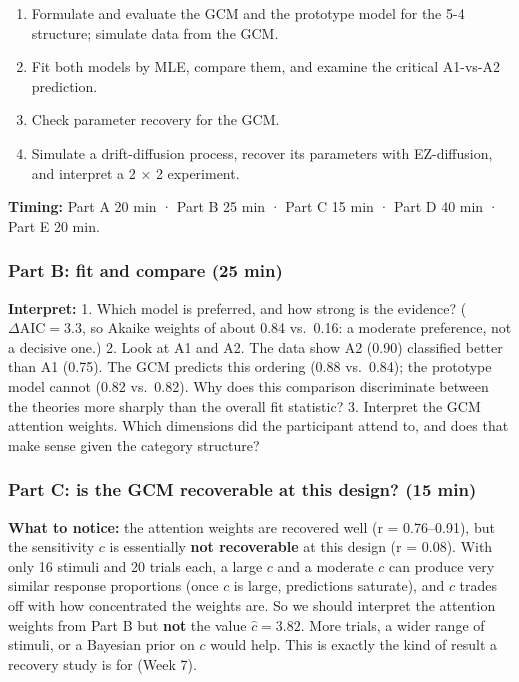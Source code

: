 \begin{enumerate}
\def\labelenumi{\arabic{enumi}.}
\tightlist
\item
  Formulate and evaluate the GCM and the prototype model for the 5-4 structure;
  simulate data from the GCM.
\item
  Fit both models by MLE, compare them, and examine the critical
  A1-vs-A2 prediction.
\item
  Check parameter recovery for the GCM.
\item
  Simulate a drift-diffusion process, recover its parameters with
  EZ-diffusion, and interpret a 2 × 2 experiment.
\end{enumerate}

\textbf{Timing:} Part A 20 min · Part B 25 min · Part C 15 min · Part D
40 min · Part E 20 min.

\subsubsection{Part B: fit and compare (25 min)}

\textbf{Interpret:} 1. Which model is preferred, and how strong is the
evidence? (\(\Delta\mathrm{AIC} = 3.3\), so Akaike weights of about 0.84
vs.~0.16: a moderate preference, not a decisive one.) 2. Look at A1 and
A2. The data show A2 (0.90) classified better than A1 (0.75). The GCM
predicts this ordering (0.88 vs.~0.84); the prototype model cannot (0.82
vs.~0.82). Why does this comparison discriminate between the theories
more sharply than the overall fit statistic? 3. Interpret the GCM
attention weights. Which dimensions did the participant attend to, and
does that make sense given the category structure?

\subsubsection{Part C: is the GCM recoverable at this design? (15 min)}

\textbf{What to notice:} the attention weights are recovered well (r =
0.76--0.91), but the sensitivity \(c\) is essentially \textbf{not
recoverable} at this design (r = 0.08). With only 16 stimuli and 20
trials each, a large \(c\) and a moderate \(c\) can produce very similar
response proportions (once \(c\) is large, predictions saturate), and
\(c\) trades off with how concentrated the weights are. So we should
interpret the attention weights from Part B but \textbf{not} the value
\(\hat c = 3.82\). More trials, a wider range of stimuli, or a Bayesian
prior on \(c\) would help. This is exactly the kind of result a recovery
study is for (Week 7).

